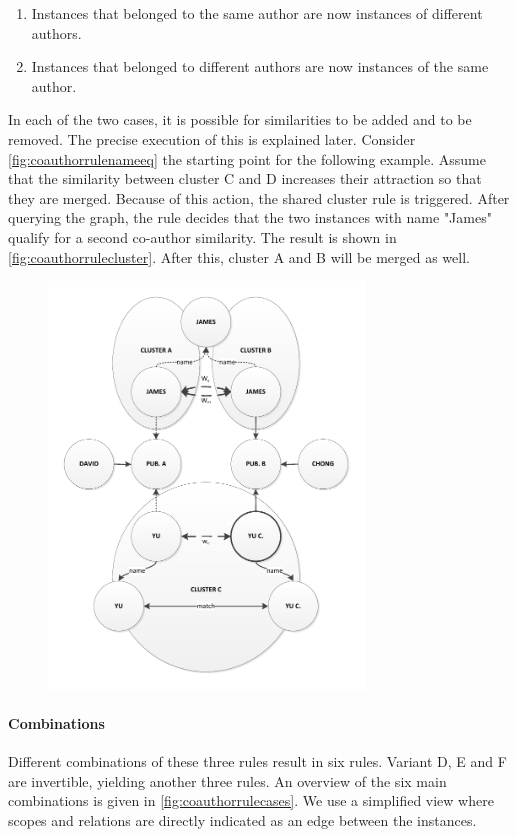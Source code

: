 \begin{enumerate}
\item Instances that belonged to the same author are now instances of different authors.
\item Instances that belonged to different authors are now instances of the same author.
\end{enumerate}

In each of the two cases, it is possible for similarities to be added and to be removed. The precise execution of this is explained later. Consider \autoref{fig:coauthorrulenameeq} the starting point for the following example. Assume that the similarity between cluster C and D increases their attraction so that they are merged. Because of this action, the shared cluster rule is triggered. After querying the graph, the rule decides that the two instances with name "James" qualify for a second co-author similarity. The result is shown in \autoref{fig:coauthorrulecluster}. After this, cluster A and B will be merged as well.

\begin{figure}[htb]
	\centering
		\includegraphics[width=0.75\textwidth]{fig/coauthorrulecluster}
	\caption{}
	\label{fig:coauthorrulecluster}
\end{figure}

\paragraph{Combinations} Different combinations of these three rules result in six rules. Variant D, E and F are invertible, yielding another three rules. An overview of the six main combinations is given in \autoref{fig:coauthorrulecases}. We use a simplified view where scopes and relations are directly indicated as an edge between the instances.

